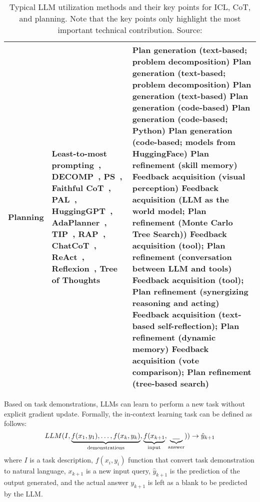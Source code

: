 \begin{table}[h!]
\begin{tabularx}{\textwidth}{|l|X|X|}
		\textbf{Planning}                         & Least-to-most prompting~\cite{zhou2022least}, DECOMP~\cite{khot2022decomposed}, PS~\cite{wang2023plan}, Faithful CoT~\cite{lyu2023faithful}, PAL~\cite{gao2022pal}, HuggingGPT~\cite{shen2023hugginggpt}, AdaPlanner~\cite{sun2023adaplanner}, TIP~\cite{lu2023multimodal}, RAP~\cite{hao2023reasoning}, ChatCoT~\cite{chen2023chatcot}, ReAct~\cite{yao2022react}, Reflexion~\cite{shinn2023reflexion}, Tree of Thoughts~\cite{yao2023tree} & Plan generation (text-based; problem decomposition) \newline Plan generation (text-based; problem decomposition) \newline Plan generation (text-based) \newline Plan generation (code-based) \newline Plan generation (code-based; Python) \newline Plan generation (code-based; models from HuggingFace) \newline Plan refinement (skill memory) \newline Feedback acquisition (visual perception) \newline Feedback acquisition (LLM as the world model; Plan refinement (Monte Carlo Tree Search)) \newline Feedback acquisition (tool); Plan refinement (conversation between LLM and tools) \newline Feedback acquisition (tool); Plan refinement (synergizing reasoning and acting) \newline Feedback acquisition (text-based self-reflection); Plan refinement (dynamic memory) \newline Feedback acquisition (vote comparison); Plan refinement (tree-based search) \\
		\hline
	\end{tabularx}
	\caption{Typical LLM utilization methods and their key points for ICL, CoT, and planning. Note that the key points only highlight the most important technical contribution. Source: \textcite{survey}}
	\label{tab:utilization-methods}
\end{table}

Based on task demonstrations, LLMs can learn to perform a new task without explicit gradient update.
Formally, the in-context learning task can be defined as follows:
\begin{equation}
	LLM(I, \underbrace{f(x_1, y_1), \dots, f(x_k, y_k)}_\text{demonstrations}, \underbrace{f(x_{k+1}}_\text{input}, \underbrace{\uline{~~~}}_\text{answer})) \rightarrow \hat{y}_{k+1}
	\label{eq:ict}
\end{equation}
where $I$ is a task description, $f(x_i, y_i)$ function that convert task demonstration to natural language, $x_{k+1}$ is a new input query, $\hat{y}_{k+1}$ is the prediction of the output generated, and the actual answer $y_{k+1}$ is left as a blank to be predicted by the LLM\@.


